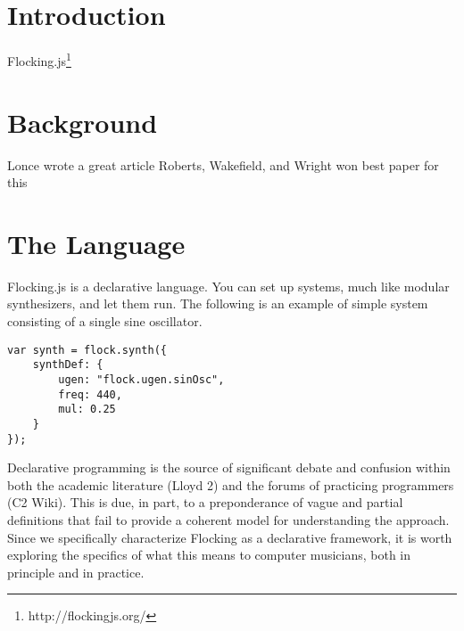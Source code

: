 \documentclass{article}
\title{\papertitle}
\begin{document}
%
\capstartfalse
\maketitle
\capstarttrue
%
\begin{abstract}
Flocking.js is an awesome language for the propogation of awesomeness in sound and web audio.
\end{abstract}
%

\section{Introduction}\label{sec:introduction}

Flocking.js\footnote{http://flockingjs.org/}



\section{Background}

Lonce wrote a great article \cite{DBLP:journals/comj/WyseS13}
Roberts, Wakefield, and Wright won best paper for this \cite{roberts_web_2013}


\section{The Language}

Flocking.js is a declarative language. You can set up systems, much like modular synthesizers, and let them run. The following is an example of simple system consisting of a single sine oscillator. 

\begin{verbatim}
var synth = flock.synth({
    synthDef: {
        ugen: "flock.ugen.sinOsc",
        freq: 440,
        mul: 0.25
    }
});
\end{verbatim}

Declarative programming is the source of significant debate and confusion within both the academic literature (Lloyd 2) and the forums of practicing programmers (C2 Wiki). This is due, in part, to a preponderance of vague and partial definitions that fail to provide a coherent model for understanding the approach. Since we specifically characterize Flocking as a declarative framework, it is worth exploring the specifics of what this means to computer musicians, both in principle and in practice.
\end{document}
